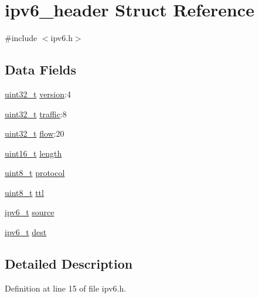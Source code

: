 \hypertarget{structipv6__header}{\section{ipv6\+\_\+header Struct Reference}
\label{structipv6__header}
}


{\ttfamily \#include $<$ipv6.\+h$>$}

\subsection*{Data Fields}
\begin{DoxyCompactItemize}
\item 
\hyperlink{aplus_8h_a53a0df51603c77c2aa5b9ea61b606a82}{uint32\+\_\+t} \hyperlink{structipv6__header_acf470d4fdf8b7215b3a2b02b0bf030b6}{version}\+:4
\item 
\hyperlink{aplus_8h_a53a0df51603c77c2aa5b9ea61b606a82}{uint32\+\_\+t} \hyperlink{structipv6__header_a606cd7e1d19fc609e648d88aabcd7b55}{traffic}\+:8
\item 
\hyperlink{aplus_8h_a53a0df51603c77c2aa5b9ea61b606a82}{uint32\+\_\+t} \hyperlink{structipv6__header_aa6ff2108b230be0d4bbafbc25ae7bc23}{flow}\+:20
\item 
\hyperlink{aplus_8h_a5a8b2dc9e45a9ee81a94ef304fb62505}{uint16\+\_\+t} \hyperlink{structipv6__header_a20e60988c954fcd0ee95248930ed616a}{length}
\item 
\hyperlink{aplus_8h_ae0430369c5a35dcdbc0bc19dcbb33a03}{uint8\+\_\+t} \hyperlink{structipv6__header_af41f2a0627f0f1dbd7e5fa905a090984}{protocol}
\item 
\hyperlink{aplus_8h_ae0430369c5a35dcdbc0bc19dcbb33a03}{uint8\+\_\+t} \hyperlink{structipv6__header_a33bb04e114be3a3e1d5dd2c360bc4844}{ttl}
\item 
\hyperlink{netif_8h_a0a195da7affbedb767969c3a02c9a82d}{ipv6\+\_\+t} \hyperlink{structipv6__header_a1ad13965e74030de39800b8208b81d50}{source}
\item 
\hyperlink{netif_8h_a0a195da7affbedb767969c3a02c9a82d}{ipv6\+\_\+t} \hyperlink{structipv6__header_ae2c5d1ad1745ee57c4be6f9e5ed46511}{dest}
\end{DoxyCompactItemize}


\subsection{Detailed Description}


Definition at line 15 of file ipv6.\+h.



